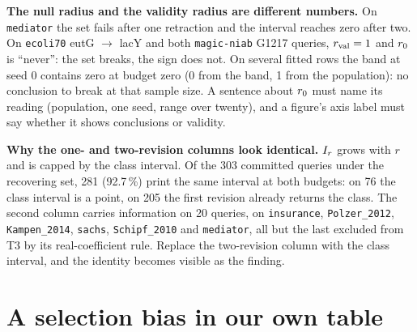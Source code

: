 \textbf{The null radius and the validity radius are different numbers.} On \texttt{mediator} the set
fails after one retraction and the interval reaches zero after two. On \texttt{ecoli70} eutG $\to$
lacY and both \texttt{magic-niab} G1217 queries, $r_{\mathrm{val}} = 1$ and $r_{0}$ is ``never'': the set breaks,
the sign does not. On several fitted rows the band at seed 0 contains zero at budget zero (0 from the
band, 1 from the population): no conclusion to break at that sample size. A sentence about $r_{0}$
must name its reading (population, one seed, range over twenty), and a figure's axis label must say
whether it shows conclusions or validity.

\textbf{Why the one- and two-revision columns look identical.} $I_{r}$ grows with $r$ and is capped by
the class interval. Of the 303 committed queries under the recovering set, 281 (92.7\,\%) print the
same interval at both budgets: on 76 the class interval is a point, on 205 the first revision already
returns the class. The second column carries information on 20 queries, on \texttt{insurance},
\texttt{Polzer\_2012}, \texttt{Kampen\_2014}, \texttt{sachs}, \texttt{Schipf\_2010} and
\texttt{mediator}, all but the last excluded from T3 by its real-coefficient rule. Replace the
two-revision column with the class interval, and the identity becomes visible as the finding.


\begin{antes}
\end{antes}

\section{A selection bias in our own table}

